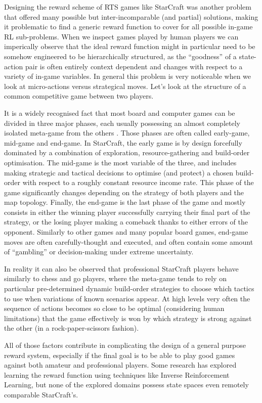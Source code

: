 Designing the reward scheme of RTS games like StarCraft was another problem that
offered many possible but inter-incomparable (and partial) solutions, making it
problematic to find a generic reward function to cover for all possible in-game
RL sub-problems. When we inspect games played by human players we can
imperically observe that the ideal reward function might in particular need to
be somehow engineered to be hierarchically structured, as the ``goodness'' of a
state-action pair is often entirely context dependent and changes with respect
to a variety of in-game variables. In general this problem is very noticeable
when we look at micro-actions versus strategical moves. Let's look at the
structure of a common competitive game between two players.

It is a widely recognised fact that most board and computer games can be divided
in three major phases, each usually possessing an almost completely isolated
meta-game from the others \citep{liquipediastrat}. Those phases are often called
early-game, mid-game and end-game. In StarCraft, the early game is by design
forcefully dominated by a combination of exploration, resource-gathering and
build-order optimisation. The mid-game is the most variable of the three, and
includes making strategic and tactical decisions to optimise (and protect) a
chosen build-order with respect to a roughly constant resource income rate. This
phase of the game significantly changes depending on the strategy of both
players and the map topology. Finally, the end-game is the last phase of the
game and mostly consists in either the winning player successfully carrying
their final part of the strategy, or the losing player making a comeback thanks
to either errors of the opponent. Similarly to other games and many popular
board games, end-game moves are often carefully-thought and executed, and often
contain some amount of ``gambling'' or decision-making under extreme
uncertainty.

In reality it can also be observed that professional StarCraft players behave
similarly to chess and go players, where the meta-game tends to rely on
particular pre-determined dynamic build-order strategies to choose which tactics
to use when variations of known scenarios appear. At high levels very often the
sequence of actions becomes so close to be optimal (considering human
limitations) that the game effectively is won by which strategy is strong
against the other (in a rock-paper-scissors fashion).

All of those factors contribute in complicating the design of a general purpose
reward system, especially if the final goal is to be able to play good games
against both amateur and professional players. Some research has explored
learning the reward function using techniques like Inverse Reinforcement
Learning\citep{ng2000algorithms}, but none of the explored domains possess state
spaces even remotely comparable StarCraft's.

